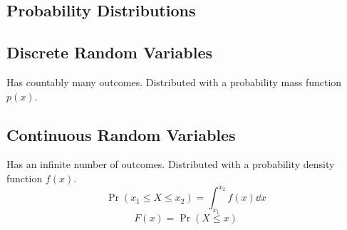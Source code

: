 \documentclass{article}
\begin{document}
\begin{minipage}{126.1962963mm}
    \begin{multicols}{2}
        \section*{Probability Distributions}
        \subsection*{Discrete Random Variables}
        Has countably many outcomes. Distributed with a
        probability mass function $p(x)$.
        \subsection*{Continuous Random Variables}
        Has an infinite number of outcomes. Distributed with a
        probability density function $f(x)$.
        \begin{equation*}
            \Pr{\left( x_1 \leq X \leq x_2 \right)} = \int_{x_1}^{x_2} f(x) \dd{x}
        \end{equation*}
        \begin{equation*}
            F(x) = \Pr{\left( X \leq x \right)}
        \end{equation*}

\end{multicols}
\end{minipage}
\end{document}
